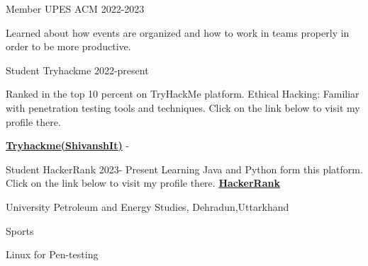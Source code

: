 \documentclass[11pt]{spidercv}
\begin{document}
    \begin{MainPart}

    \Experience
        {\ColorHighlight}
		{Member}
		{UPES ACM}
        {2022-2023}
        {   
        Learned about how events are organized and how to work in teams properly in order to be more productive.
    
        }
    \Experience
        {\ColorHighlight}
		{Student}
		{Tryhackme}
        {2022-present}
        {  
        Ranked in the top 10 percent on TryHackMe platform.
        Ethical Hacking: Familiar with penetration testing tools and techniques.
        Click on the link below to visit my profile there.
        
        \href{https://tryhackme.com/p/ShivanshIt}
        {\textbf{Tryhackme(ShivanshIt)}} 
- 
           
        }
    \Experience
        {\ColorHighlight}
		{Student}
		{HackerRank}
        {2023- Present}
        {   
        Learning Java and Python form this platform.
           Click on the link below to visit my profile there.
           \vspace{1\baselineskip}
          \href{https://www.hackerrank.com/mynameisvasu089?hr_r=1}{\textbf
          {HackerRank}} 
        }


    
    \vspace{1\baselineskip}
    {University Petroleum and Energy Studies, Dehradun,Uttarkhand}
\vspace{2\baselineskip}




   
    \vspace*{0.5cm}
    \begin{DoubleColumns}
        \begin{ItemList}{\ColorHighlight}
            \item [] Sports
            \item [] Linux for Pen-testing
        \end{ItemList}
        \nextcolumn
        \begin{ItemList}{\ColorHighlight}
            \item [] 
        \end{ItemList}
    \end{DoubleColumns}

    \end{MainPart}

    
\end{document}
